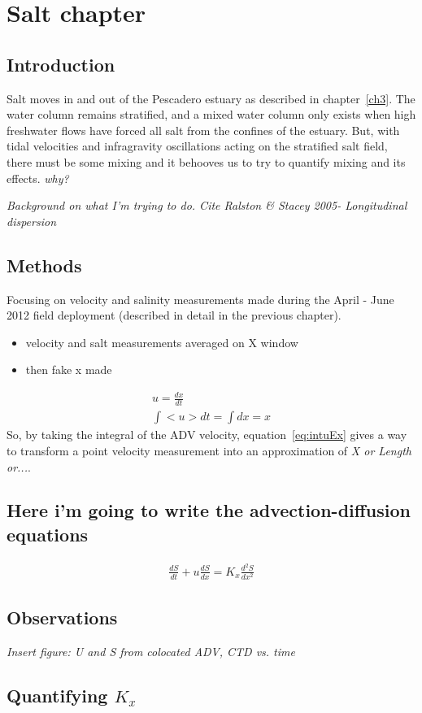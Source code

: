 \chapter{Salt chapter}
\label{chSalt}


\section{Introduction}
Salt moves in and out of the Pescadero estuary as described in chapter~\ref{ch3}. The water column remains stratified, and a mixed water column only exists when high freshwater flows have forced all salt from the confines of the estuary. But, with tidal velocities and infragravity oscillations acting on the stratified salt field, there must be some mixing and it behooves us to try to quantify mixing and its effects. \emph{why?}

\emph{Background on what I'm trying to do.  Cite Ralston & Stacey 2005- Longitudinal dispersion}

\section{Methods}
Focusing on velocity and salinity measurements made during the April - June 2012 field deployment (described in detail in the previous chapter).

\begin{itemize} \item{velocity and salt measurements averaged on X window} \item{then fake x made} \end{itemize}

\begin{eqnarray}
u = \frac{dx}{dt} \label{eq:uEdxdt}\\
\int{<u>dt} = \int{dx} = x \label{eq:intuEx}
\end{eqnarray}
So, by taking the integral of the ADV velocity, equation~\ref{eq:intuEx} gives a way to transform a point velocity measurement into an approximation of \emph{X or Length or...}. 


\section{Here i'm going to write the advection-diffusion equations}
\begin{eqnarray}
\frac{dS}{dt} + u\frac{dS}{dx} = K_x\frac{d^2S}{dx^2} \label{eq:1dadvdiff}
\end{eqnarray}


\section{Observations}
\emph{Insert figure: U and S from colocated ADV, CTD vs. time}



\section{Quantifying $K_x$}
